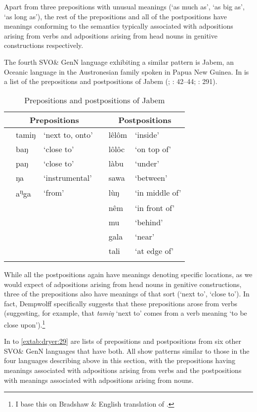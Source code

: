 \documentclass[output=paper]{langsci/langscibook}
\begin{document}
Apart from three prepositions with unusual meanings (‘as much as’, ‘as big as’, ‘as long as’), the rest of the prepositions and all of the postpositions have meanings conforming to the semantics typically associated with adpositions arising from verbs and adpositions arising from head nouns in genitive constructions respectively.

The fourth SVO\& GenN language exhibiting a similar pattern is Jabem, an Oceanic language in the Austronesian family spoken in Papua New Guinea. In  is a list of the prepositions and postpositions of Jabem (\citealt{Dempwolff1939}; \citealt{BradshawCzobor2005}: 42–44; \citealt{Ross2002}: 291).

\begin{table}
\caption{Prepositions and postpositions of Jabem }
\label{extab:dryer:23}
\begin{tabularx}{\textwidth}{lll lll} 
\lsptoprule
 & \multicolumn{2}{c}{\bfseries Prepositions} &  & \multicolumn{2}{c}{\bfseries Postpositions}\\
\midrule
 & tamiŋ & ‘next to, onto’ &  & lêlôm & ‘inside’\\
 & baŋ & ‘close to’ &  & lôlôc & ‘on top of’\\
 & paŋ & ‘close to’ &  & làbu & ‘under’\\
 & ŋa & ‘instrumental’ &  & sawa & ‘between’\\
 & a\textsuperscript{ŋ}ga & ‘from’ &  & lùŋ & ‘in middle of’\\
 &  &  &  & nêm & ‘in front of’\\
 &  &  &  & mu & ‘behind’\\
 &  &  &  & gala & ‘near’\\
 &  &  &  & tali & ‘at edge of’\\
\lspbottomrule
\end{tabularx}
\end{table}

While all the postpositions again have meanings denoting specific locations, as we would expect of adpositions arising from head nouns in genitive constructions, three of the prepositions also have meanings of that sort (‘next to’, ‘close to’). In fact, Dempwolff specifically suggests that these prepositions arose from verbs (suggesting, for example, that \textit{tamiŋ} ‘next to’ comes from a verb meaning ‘to be close upon’).\footnote{I base this on Bradshaw \&  English translation of \citet{Dempwolff1939}.}

In  to \ref{extab:dryer:29} are lists of prepositions and postpositions from six other SVO\& GenN languages that have both. All show patterns similar to those in the four languages describing above in this section, with the prepositions having meanings associated with adpositions arising from verbs and the postpositions with meanings associated with adpositions arising from nouns.
\end{document}

